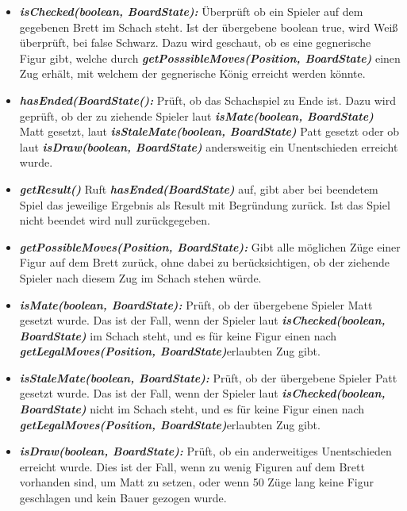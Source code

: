 \documentclass[parskip=full]{scrartcl}
\begin{document}
\begin{itemize}
\begin{description}
				\end{description}
				\item \textbf{\textit{isChecked(boolean, BoardState):}} Überprüft ob ein Spieler auf dem gegebenen Brett im Schach steht. Ist der übergebene boolean true, wird Weiß überprüft, bei false Schwarz. Dazu wird geschaut, ob es eine gegnerische Figur gibt, welche durch \textbf{\textit{getPosssibleMoves(Position, BoardState)}} einen Zug erhält, mit welchem der gegnerische König erreicht werden könnte.
				\item \textbf{\textit{hasEnded(BoardState():}} Prüft, ob das Schachspiel zu Ende ist. Dazu wird geprüft, ob der zu ziehende Spieler laut \textbf{\textit{isMate(boolean, BoardState)}} Matt gesetzt, laut \textbf{\textit{isStaleMate(boolean, BoardState)}} Patt gesetzt oder ob laut  \textbf{\textit{isDraw(boolean, BoardState)}} andersweitig ein Unentschieden erreicht wurde.
				\item \textbf{\textit{getResult()}} Ruft \textbf{\textit{hasEnded(BoardState)}} auf, gibt aber bei beendetem Spiel das jeweilige Ergebnis als Result mit Begründung zurück. Ist das Spiel nicht beendet wird null zurückgegeben.
				\item \textbf{\textit{getPossibleMoves(Position, BoardState):}} Gibt alle möglichen Züge einer Figur auf dem Brett zurück, ohne dabei zu berücksichtigen, ob der ziehende Spieler nach diesem Zug im Schach stehen würde.
				\item \textbf{\textit{isMate(boolean, BoardState):}} Prüft, ob der übergebene Spieler Matt gesetzt wurde. Das ist der Fall, wenn der Spieler laut \textbf{\textit{isChecked(boolean, BoardState)}} im Schach steht, und es für keine Figur einen nach \textbf{\textit{getLegalMoves(Position, BoardState)}}erlaubten Zug gibt.
				\item \textbf{\textit{isStaleMate(boolean, BoardState):}} Prüft, ob der übergebene Spieler Patt gesetzt wurde. Das ist der Fall, wenn der Spieler laut \textbf{\textit{isChecked(boolean, BoardState)}} nicht im Schach steht, und es für keine Figur einen nach \textbf{\textit{getLegalMoves(Position, BoardState)}}erlaubten Zug gibt.
				\item \textbf{\textit{isDraw(boolean, BoardState):}} Prüft, ob ein anderweitiges Unentschieden erreicht wurde. Dies ist der Fall, wenn zu wenig Figuren auf dem Brett vorhanden sind, um Matt zu setzen, oder wenn 50 Züge lang keine Figur geschlagen und kein Bauer gezogen wurde.
		\end{itemize}
		\newpage
\end{document}
